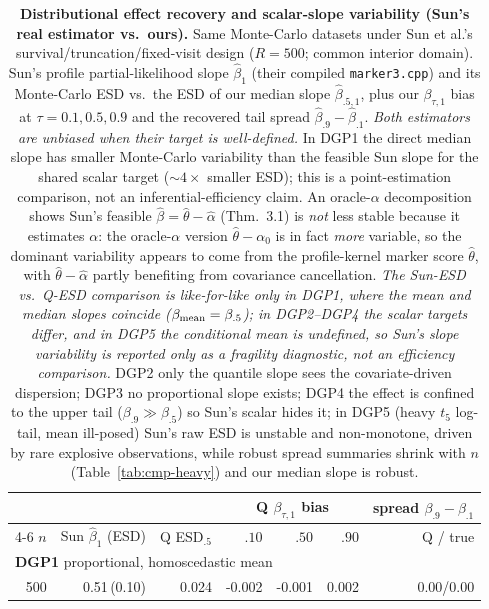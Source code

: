 \begin{table}[t]\centering\small
\caption{\textbf{Distributional effect recovery and scalar-slope variability (Sun's real estimator vs.\ ours).} Same Monte-Carlo datasets under Sun et al.'s survival/truncation/fixed-visit design ($R=500$; common interior domain). Sun's profile partial-likelihood slope $\widehat\beta_1$ (their compiled \texttt{marker3.cpp}) and its Monte-Carlo ESD vs.\ the ESD of our median slope $\widehat\beta_{.5,1}$, plus our $\beta_{\tau,1}$ bias at $\tau=0.1,0.5,0.9$ and the recovered tail spread $\widehat\beta_{.9}-\widehat\beta_{.1}$. \emph{Both estimators are unbiased when their target is well-defined.} In DGP1 the direct median slope has smaller Monte-Carlo variability than the feasible Sun slope for the shared scalar target ($\sim$$4\times$ smaller ESD); this is a point-estimation comparison, not an inferential-efficiency claim. An oracle-$\alpha$ decomposition shows Sun's feasible $\widehat\beta=\widehat\theta-\widehat\alpha$ (Thm.~3.1) is \emph{not} less stable because it estimates $\alpha$: the oracle-$\alpha$ version $\widehat\theta-\alpha_0$ is in fact \emph{more} variable, so the dominant variability appears to come from the profile-kernel marker score $\widehat\theta$, with $\widehat\theta-\widehat\alpha$ partly benefiting from covariance cancellation. \emph{The Sun-ESD vs.\ Q-ESD comparison is like-for-like only in DGP1, where the mean and median slopes coincide ($\beta_{\rm mean}=\beta_{.5}$); in DGP2--DGP4 the scalar targets differ, and in DGP5 the conditional mean is undefined, so Sun's slope variability is reported only as a fragility diagnostic, not an efficiency comparison.} DGP2 only the quantile slope sees the covariate-driven dispersion; DGP3 no proportional slope exists; DGP4 the effect is confined to the upper tail ($\beta_{.9}\!\gg\!\beta_{.5}$) so Sun's scalar hides it; in DGP5 (heavy $t_5$ log-tail, mean ill-posed) Sun's raw ESD is unstable and non-monotone, driven by rare explosive observations, while robust spread summaries shrink with $n$ (Table~\ref{tab:cmp-heavy}) and our median slope is robust.}
\label{tab:cmp-beta}\begin{tabular}{r rr rrr r}\toprule
&&&\multicolumn{3}{c}{Q $\beta_{\tau,1}$ bias}&spread $\beta_{.9}{-}\beta_{.1}$\\
\cmidrule(lr){4-6}
$n$&Sun $\widehat\beta_1$ (ESD)&Q ESD$_{.5}$&$.10$&$.50$&$.90$&Q / true\\\midrule
\multicolumn{7}{l}{\textbf{DGP1} proportional, homoscedastic mean}\\
500 & 0.51\,(0.10) & 0.024 & -0.002 & -0.001 & 0.002 & 0.00/0.00\\

\end{tabular}
\end{table}
